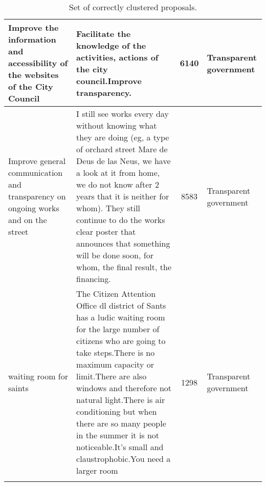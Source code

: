 \begin{spacing}{1}
\begin{longtable}{m{30mm}|m{85mm}|c|m{15mm}}
 Improve the information and accessibility of the websites of the City Council & Facilitate the knowledge of the activities, actions of the city council.Improve transparency. & 6140 & Transparent government \\ \hline
 Improve general communication and transparency on ongoing works and on the street & I still see works every day without knowing what they are doing (eg, a type of orchard street Mare de Deus de las Neus, we have a look at it from home, we do not know after 2 years that it is neither for whom). They still continue to do the works clear poster that announces that something will be done soon, for whom, the final result, the financing. & 8583 & Transparent government \\ \hline
 waiting room for saints & The Citizen Attention Office dl district of Sants has a ludic waiting room for the large number of citizens who are going to take steps.There is no maximum capacity or limit.There are also windows and therefore not natural light.There is air conditioning but when there are so many people in the summer it is not noticeable.It's small and claustrophobic.You need a larger room & 1298 & Transparent government \\ \hline

\caption{Set of correctly clustered proposals.}
\label{tab:positives} \\
\end{longtable}
\end{spacing}
\normalsize